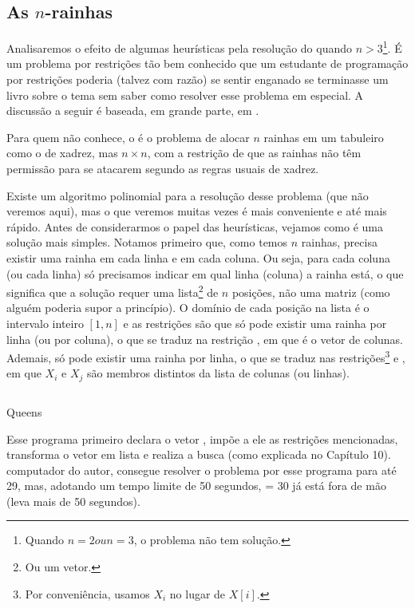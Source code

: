 \subsection{As $n$-rainhas}

Analisaremos o efeito de algumas heurísticas pela resolução do
 quando $n > 3$\footnote{Quando $n
  = 2 ou n = 3$, o problema não tem solução.}. É um problema por
restrições tão bem conhecido que um estudante de programação por
restrições poderia (talvez com razão) se sentir enganado se terminasse
um livro sobre o tema sem saber como resolver esse problema em
especial. A discussão a seguir é baseada, em grande parte, em
\cite{krzysztof}.

Para quem não conhece, o  é o
problema de alocar $n$ rainhas em um tabuleiro como o de xadrez, mas
$n\times n$, com a restrição de que as rainhas não têm permissão para
se atacarem segundo as regras usuais de xadrez.

Existe um algoritmo polinomial para a resolução desse problema (que
não veremos aqui), mas o que veremos muitas vezes é mais conveniente e
até mais rápido. Antes de considerarmos o papel das heurísticas,
vejamos como é uma solução mais simples. Notamos primeiro que, como
temos $n$ rainhas, precisa existir uma rainha em cada linha e em cada
coluna. Ou seja, para cada coluna (ou cada linha) só precisamos
indicar em qual linha (coluna) a rainha está, o que significa que a
solução requer uma lista\footnote{Ou um vetor.} de $n$ posições, não
uma matriz (como alguém poderia supor a princípio). O domínio de cada
posição na lista é o intervalo inteiro $[1,n]$ e as restrições são que
só pode existir uma rainha por linha (ou por coluna), o que se traduz
na restrição , em que  é o vetor
de colunas. Ademais, só pode existir uma rainha por linha, o que se
traduz nas restrições\footnote{Por conveniência, usamos $X_i$ no lugar
  de $X[i]$.}  e
, em que $X_i$ e
$X_j$ são membros distintos da lista de colunas (ou linhas).

\begin{listing}[H]
  \inputminted{prolog}{../Exemplos/Cap11/prog1_queens.ecl}
  \caption{Queens}
\end{listing}

Esse programa primeiro declara o vetor , impõe a ele
as restrições mencionadas, transforma o vetor em lista e realiza a
busca (como explicada no Capítulo 10).%
computador do autor, consegue resolver o problema por esse programa
para  até 29, mas, adotando um tempo limite de 50 segundos,
 = 30 já está fora de mão (leva mais de 50 segundos).

